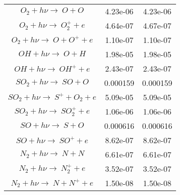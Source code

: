 \documentclass[11pt]{article}
\begin{document}
\begin{tabular}{ccc}
 $O_2 + h\nu \rightarrow\ O + O$  &   4.23e-06 &   4.23e-06 \\
 $O_2 + h\nu \rightarrow\ O_2^+ + e$  &   4.64e-07 &   4.67e-07 \\
 $O_2 + h\nu \rightarrow\ O + O^+ + e$  &   1.10e-07 &   1.10e-07 \\
 $OH + h\nu \rightarrow\ O + H$  &   1.98e-05 &   1.98e-05 \\
 $OH + h\nu \rightarrow\ OH^+ + e$  &   2.43e-07 &   2.43e-07 \\
 $SO_2 + h\nu \rightarrow\ SO + O$  &   0.000159 &   0.000159 \\
 $SO_2 + h\nu \rightarrow\ S^+ + O_2 + e$  &   5.09e-05 &   5.09e-05 \\
 $SO_2 + h\nu \rightarrow\ SO_2^+ + e$  &   1.06e-06 &   1.06e-06 \\
 $SO + h\nu \rightarrow\ S + O$  &   0.000616 &   0.000616 \\
 $SO + h\nu \rightarrow\ SO^+ + e$  &   8.62e-07 &   8.62e-07 \\
 $N_2 + h\nu \rightarrow\ N + N$  &   6.61e-07 &   6.61e-07 \\
 $N_2 + h\nu \rightarrow\ N_2^+ + e$  &   3.52e-07 &   3.52e-07 \\
 $N_2 + h\nu \rightarrow\ N + N^+ + e$  &   1.50e-08 &   1.50e-08 \\

\end{tabular}
\end{document}
